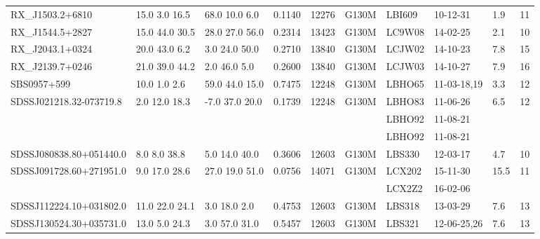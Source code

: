 \documentclass[iop]{emulateapj-rtx4}
\begin{document}
\begin{table}[ht]
\begin{center}
\begin{tabular}{l l l l l l l l l l}
RX\_J1503.2+6810  &     15.0  3.0  16.5  &    68.0  10.0  6.0     &   0.1140  & 12276  		    &   G130M  &   LBI609    		& 10-12-31 		   &   1.9  &      11         \\
RX\_J1544.5+2827  &   15.0  44.0  30.5  &   28.0  27.0  56.0    &   0.2314  & 13423  	            &   G130M  &   LC9W08		& 14-02-25		   &   2.1  &      10         \\
RX\_J2043.1+0324  &     20.0  43.0  6.2  &     3.0  24.0  50.0    &   0.2710  & 13840		    &   G130M  &   LCJW02		& 14-10-23		   &   7.8  &      15         \\
RX\_J2139.7+0246  &   21.0  39.0  44.2  &      2.0  46.0  5.0     &   0.2600  & 13840  		    &   G130M  &   LCJW03		& 14-10-27  		   & 	7.9  &      16         \\
SBS0957+599         &       10.0  1.0  2.6  &     59.0  44.0  15.0  &    0.7475  & 12248  		    &   G130M  &   LBHO65		& 11-03-18,19  		   &   3.3  &      12         \\
SDSSJ021218.32-073719.8  & 2.0  12.0  18.3  &    -7.0  37.0  20.0  &    0.1739  & 12248  	    &   G130M  &   LBHO83		& 11-06-26		   &   6.5  &      12         \\
				        	     & 	  	  	  	&    		  	       &    	  	 & 	  	    &                 &   LBHO92		& 11-08-21		   &          &                   \\
				        	     & 	  	  	  	&    		  	       &    	  	 & 	  	    &                 &   LBHO92		& 11-08-21		   &          &                   \\
SDSSJ080838.80+051440.0 &   8.0  8.0  38.8  &     5.0  14.0  40.0  &    0.3606  & 12603	    &   G130M  &   LBS330   		& 12-03-17  		   &   4.7  &      10         \\
SDSSJ091728.60+271951.0 & 9.0  17.0  28.6  &    27.0  19.0  51.0 &    0.0756  & 14071	    &   G130M  &   LCX202			& 15-11-30		   & 15.5  &      11         \\
				        	     & 	  	  	        &    		  	       &    	  	 & 	  	    &                 &   LCX2Z2			& 16-02-06		   &          &                   \\
SDSSJ112224.10+031802.0 & 11.0  22.0  24.1 &     3.0  18.0  2.0    &    0.4753  & 12603      &   G130M  &   LBS318			& 13-03-29		   &   7.6  &      13         \\
SDSSJ130524.30+035731.0 & 13.0  5.0  24.3  &    3.0  57.0  31.0   &    0.5457  & 12603	    &   G130M  &   LBS321			& 12-06-25,26		   &   7.6  &      13         \\


\end{tabular}
\end{center}
\end{table}
\end{document}
